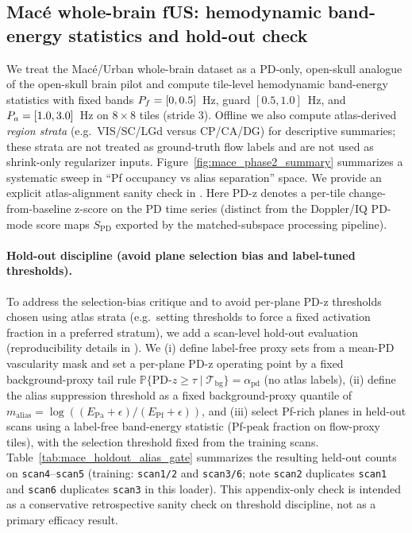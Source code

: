 \subsection{Mac{\'e} whole-brain fUS: hemodynamic band-energy statistics and hold-out check}
We treat the Mac{\'e}/Urban whole-brain dataset as a PD-only, open-skull analogue of the open-skull brain pilot and compute tile-level hemodynamic band-energy statistics with fixed bands $P_f=[0,0.5]$~Hz, guard $[0.5,1.0]$~Hz, and $P_a=[1.0,3.0]$~Hz on $8\times 8$ tiles (stride 3). Offline we also compute atlas-derived \emph{region strata} (e.g.\ VIS/SC/LGd versus CP/CA/DG) for descriptive summaries; these strata are not treated as ground-truth flow labels and are not used as shrink-only regularizer inputs. Figure~\ref{fig:mace_phase2_summary} summarizes a systematic sweep in ``Pf occupancy vs alias separation'' space. We provide an explicit atlas-alignment sanity check in .
Here PD-z denotes a per-tile change-from-baseline z-score on the PD time series (distinct from the Doppler/IQ PD-mode score maps $S_{\mathrm{PD}}$ exported by the matched-subspace processing pipeline).

\paragraph{Hold-out discipline (avoid plane selection bias and label-tuned thresholds).}
To address the selection-bias critique and to avoid per-plane PD-z thresholds chosen using atlas strata (e.g.\ setting thresholds to force a fixed activation fraction in a preferred stratum), we add a scan-level hold-out evaluation (reproducibility details in ). We (i) define label-free proxy sets from a mean-PD vascularity mask and set a per-plane PD-z operating point by a fixed background-proxy tail rule $\mathbb{P}\{\mathrm{PD}\text{-}z\ge\tau\mid \mathcal{T}_{\mathrm{bg}}\}=\alpha_{\mathrm{pd}}$ (no atlas labels), (ii) define the alias suppression threshold as a fixed background-proxy quantile of $m_{\mathrm{alias}}=\log((E_{\mathrm{Pa}}+\epsilon)/(E_{\mathrm{Pf}}+\epsilon))$, and (iii) select Pf-rich planes in held-out scans using a label-free band-energy statistic (Pf-peak fraction on flow-proxy tiles), with the selection threshold fixed from the training scans. Table~\ref{tab:mace_holdout_alias_gate} summarizes the resulting held-out counts on \texttt{scan4}--\texttt{scan5} (training: \texttt{scan1/2} and \texttt{scan3/6}; note \texttt{scan2} duplicates \texttt{scan1} and \texttt{scan6} duplicates \texttt{scan3} in this loader). This appendix-only check is intended as a conservative retrospective sanity check on threshold discipline, not as a primary efficacy result.

